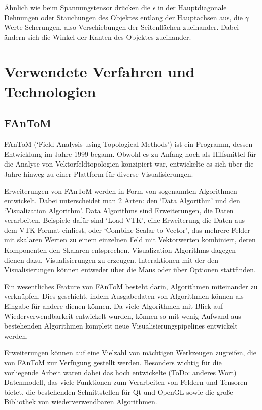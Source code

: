\documentclass[a4paper,fontsize=12pt,toc=bib,halfparskip]{scrartcl}
\begin{document}
\"Ahnlich wie beim Spannungstensor dr\"ucken die $\epsilon$ in der Hauptdiagonale Dehnungen oder Stauchungen des Objektes entlang der Hauptachsen aus, die $\gamma$ Werte Scherungen, also Verschiebungen der Seitenfl\"achen zueinander. Dabei \"andern sich die Winkel der Kanten des Objektes zueinander.

\section{Verwendete Verfahren und Technologien}
\label{sec:Technologien}
\subsection{FAnToM}
FAnToM\cite{fantomWebsite}\cite{wiebel2009fantom} (`Field Analysis using Topological Methods') ist ein Programm, dessen Entwicklung im Jahre 1999 begann. Obwohl es zu Anfang noch als Hilfsmittel f\"ur die Analyse von Vektorfeldtopologien konzipiert war, entwickelte es sich \"uber die Jahre hinweg zu einer Plattform f\"ur diverse Visualisierungen.

Erweiterungen von FAnToM werden in Form von sogenannten Algorithmen entwickelt. Dabei unterscheidet man 2 Arten: den `Data Algorithm' und den `Visualization Algorithm'. Data Algorithms sind Erweiterungen, die Daten verarbeiten. Beispiele daf\"ur sind `Load VTK', eine Erweiterung die Daten aus dem VTK Format einliest, oder `Combine Scalar to Vector', das mehrere Felder mit skalaren Werten zu einem einzelnen Feld mit Vektorwerten kombiniert, deren Komponenten den Skalaren entsprechen.
Visualization Algorithms dagegen dienen dazu, Visualisierungen zu erzeugen. Interaktionen mit der den Visualisierungen k\"onnen entweder \"uber die Maus oder \"uber Optionen stattfinden.

Ein wesentliches Feature von FAnToM besteht darin, Algorithmen miteinander zu verkn\"upfen. Dies geschieht, indem Ausgabedaten von Algorithmen k\"onnen als Eingabe f\"ur andere dienen k\"onnen. Da viele Algorithmen mit Blick auf Wiederverwendbarkeit entwickelt wurden, k\"onnen so mit wenig Aufwand aus bestehenden Algorithmen komplett neue Visualisierungspipelines entwickelt werden.

Erweiterungen k\"onnen auf eine Vielzahl von m\"achtigen Werkzeugen zugreifen, die von FAnToM zur Verf\"ugung gestellt werden. Besonders wichtig f\"ur die vorliegende Arbeit waren dabei das hoch entwickelte (ToDo: anderes Wort) Datenmodell, das viele Funktionen zum Verarbeiten von Feldern und Tensoren bietet, die bestehenden Schnittstellen f\"ur Qt und OpenGL sowie die gro{\ss}e Bibliothek von wiederverwendbaren Algorithmen.
\end{document}
